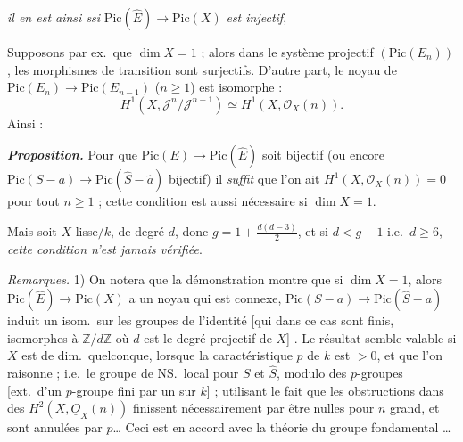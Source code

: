 \documentclass[11pt,a4paper]{article}
\begin{document}
\emph{il en est ainsi ssi} $\mathrm{Pic}(\hat{E}) \to \mathrm{Pic}(X)$ \emph{est
injectif}, \struck{\ill{}}

Supposons par ex.\ que $\dim X = 1$ ; alors dans le système projectif
$(\mathrm{Pic}(E_n))$, les morphismes de transition sont surjectifs. D'autre
part,  le noyau de $\mathrm{Pic}(E_n) \to \mathrm{Pic}(E_{n-1})$
($n \geq 1$) est isomorphe :
\[
  H^1(X, \mathcal{J}^n/\mathcal{J}^{n+1}) \simeq H^1(X, \mathcal{O}_X(n)) .
\]
Ainsi : 

\textbf{\emph{Proposition.}} Pour que $\mathrm{Pic}(E) \to \mathrm{Pic}(\hat{E})$
soit bijectif (ou encore $\mathrm{Pic}(S - a) \to \mathrm{Pic}(\hat{S} - \hat{a})$
bijectif) il  \emph{suffit} que l'on ait $H^1(X, \mathcal{O}_X(n)) = 0$
pour tout $n \geq 1$ ; cette condition est aussi nécessaire si $\dim X = 1$.

 Mais soit $X$
\ill{} lisse$/k$, de degré $d$, donc $g = 1 + \frac{d(d-3)}{2}$, et si
$d < g - 1$ i.e.\ $d \geq 6$, \emph{cette condition n'est jamais vérifiée}.

\emph{Remarques.} 1) On notera que la démonstration montre que si $\dim X = 1$,
alors $\mathrm{Pic}(\hat{E}) \to \mathrm{Pic}(X)$ a un noyau qui est connexe,
 \struck{\ill{}} \ill{}
$\mathrm{Pic}(S - a) \to \mathrm{Pic}(\hat{S} - a)$ induit un isom.\ sur les
groupes \emph{} de l'identité [qui dans ce
cas sont finis, isomorphes à $\mathbb{Z}/d\mathbb{Z}$ où $d$ est le degré
projectif de $X$] . Le résultat semble valable si $X$ est de dim.\ quelconque, lorsque
\struck{\ill{}} la caractéristique  $p$ de $k$
est $> 0$, et que l'on raisonne \emph{\ill{}} 
 ; i.e.\ le groupe de NS.\ local
\ill{} \ill{} pour $S$ et $\hat{S}$, modulo des $p$-groupes [ext.\ d'un
$p$-groupe fini par un   sur $k$] ;
utilisant le fait que les obstructions dans des $H^2(X, \underline{O}_X(n))$
finissent nécessairement par être nulles pour $n$ grand, et sont annulées par
$p$… Ceci est en accord avec la théorie du groupe fondamental …
\end{document}
